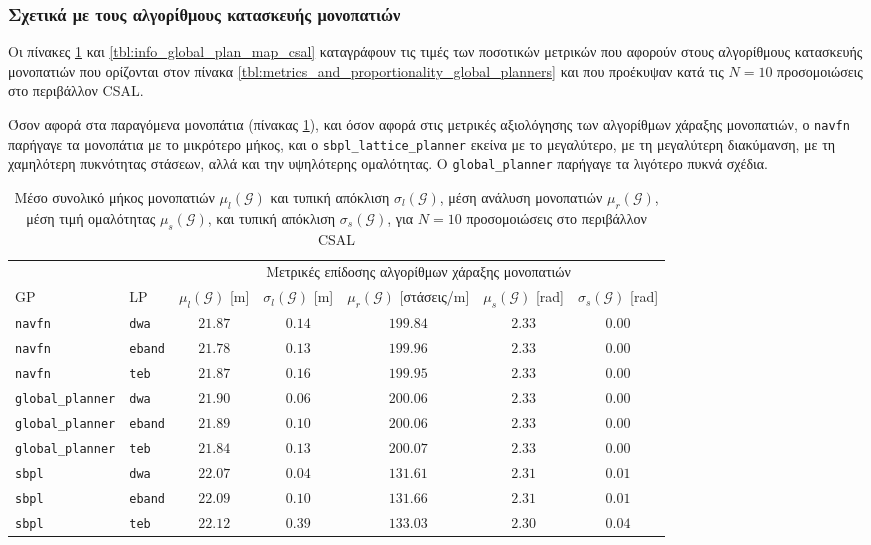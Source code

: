 \subsubsection{Σχετικά με τους αλγορίθμους κατασκευής μονοπατιών}

Οι πίνακες \ref{tbl:info_global_plan_csal} και
\ref{tbl:info_global_plan_map_csal} καταγράφουν τις τιμές των ποσοτικών
μετρικών που αφορούν στους αλγορίθμους κατασκευής μονοπατιών που ορίζονται στον
πίνακα \ref{tbl:metrics_and_proportionality_global_planners} και που προέκυψαν
κατά τις $N = 10$ προσομοιώσεις στο περιβάλλον CSAL.

Όσον αφορά στα παραγόμενα μονοπάτια (πίνακας \ref{tbl:info_global_plan_csal}),
και όσον αφορά στις μετρικές αξιολόγησης των αλγορίθμων χάραξης
μονοπατιών, ο \texttt{navfn} παρήγαγε τα μονοπάτια με το μικρότερο μήκος, και ο
\texttt{sbpl\_lattice\_planner} εκείνα με το μεγαλύτερο, με τη
μεγαλύτερη διακύμανση, με τη χαμηλότερη πυκνότητας στάσεων, αλλά και
την υψηλότερης ομαλότητας. O \texttt{global\_planner} παρήγαγε τα λιγότερο
πυκνά σχέδια.

\begin{table}[h]\hspace{-1cm}
\renewcommand{\arraystretch}{1.3}
\begin{tabular}{llccccc}
& & \multicolumn{5}{c}{Μετρικές επίδοσης αλγορίθμων χάραξης μονοπατιών} \\
\cline{3-7}
GP & LP & $\mu_{l}(\bm{\mathcal{G}})$ [m] & $\sigma_{l}(\bm{\mathcal{G}})$ [m] & $\mu_r(\bm{\mathcal{G}})$ [στάσεις/m] & $\mu_{s}(\bm{\mathcal{G}})$ [rad] & $\sigma_{s}(\bm{\mathcal{G}})$ [rad] \\ \toprule
\texttt{navfn} & \texttt{dwa} & $21.87$ & $0.14$ & $199.84$ & $2.33$ & $0.00$ \\
\texttt{navfn} & \texttt{eband} & $21.78$ & $0.13$ & $199.96$ & $2.33$ & $0.00$ \\
\texttt{navfn} & \texttt{teb} & $21.87$ & $0.16$ & $199.95$ & $2.33$ & $0.00$ \\
\texttt{global\_planner} & \texttt{dwa} & $21.90$ & $0.06$ & $200.06$ & $2.33$ & $0.00$ \\
\texttt{global\_planner} & \texttt{eband} & $21.89$ & $0.10$ & $200.06$ & $2.33$ & $0.00$ \\
\texttt{global\_planner} & \texttt{teb} & $21.84$ & $0.13$ & $200.07$ & $2.33$ & $0.00$ \\
\texttt{sbpl} & \texttt{dwa} & $22.07$ & $0.04$ & $131.61$ & $2.31$ & $0.01$ \\
\texttt{sbpl} & \texttt{eband} & $22.09$ & $0.10$ & $131.66$ & $2.31$ & $0.01$ \\
\texttt{sbpl} & \texttt{teb} & $22.12$ & $0.39$ & $133.03$ & $2.30$ & $0.04$ \\ \bottomrule
\end{tabular}
\caption{\small Μέσο συνολικό μήκος μονοπατιών $\mu_{l}(\bm{\mathcal{G}})$ και
         τυπική απόκλιση $\sigma_{l}(\bm{\mathcal{G}})$, μέση ανάλυση
         μονοπατιών $\mu_r(\bm{\mathcal{G}})$, μέση τιμή ομαλότητας
         $\mu_{s}(\bm{\mathcal{G}})$, και τυπική απόκλιση
         $\sigma_{s}(\bm{\mathcal{G}})$, για $N=10$ προσομοιώσεις στο
         περιβάλλον CSAL}
\label{tbl:info_global_plan_csal}
\end{table}

